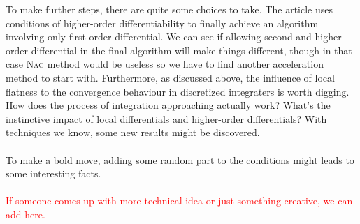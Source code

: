 \documentclass{article}
\begin{document}
To make further steps, there are quite some choices to take. The article uses conditions
of higher-order differentiability to finally achieve an algorithm involving only
first-order differential. We can see if allowing second and higher-order differential in
the final algorithm will make things different, though in that case \textsc{Nag} method
would be useless so we have to find another acceleration method to start with. Furthermore,
as discussed above, the influence of local flatness to the convergence behaviour in
discretized integraters is worth digging. How does the process of integration approaching
actually work? What's the instinctive impact of local differentials and higher-order
differentials? With techniques we know, some new results might be discovered.\\\\
To make a bold move, adding some random part to the conditions might leads to some
interesting facts.\\\\
\textcolor{red}{If someone comes up with more technical idea or just something creative,
  we can add here.}


\printbibliography
\end{document}
